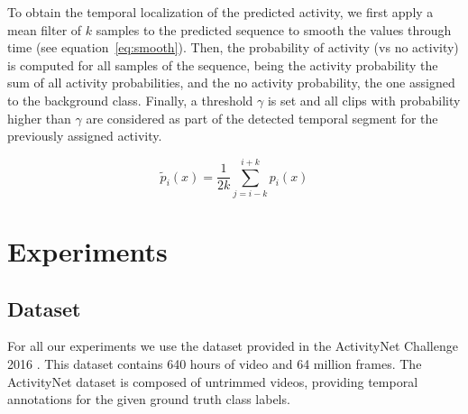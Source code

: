 \documentclass{article}
\begin{document}


To obtain the temporal localization of the predicted activity, we first apply a mean filter of $k$ samples to the predicted sequence to smooth the values through time (see equation~\ref{eq:smooth}). Then, the probability of activity (vs no activity) is computed for all samples of the sequence, being the activity probability the sum of all activity probabilities, and the no activity probability, the one assigned to the background class. Finally, a threshold $\gamma$ is set and all clips with probability higher than $\gamma$ are considered as part of the detected temporal segment for the previously assigned activity.

\begin{equation}
	\tilde{p}_i(x) = \frac{1}{2k} \sum_{j=i-k}^{i+k} p_i(x)
    \label{eq:smooth}
\end{equation}



\section{Experiments}

\subsection{Dataset}
For all our experiments we use the dataset provided in the ActivityNet Challenge 2016 \cite{}. This dataset contains 640 hours of video and 64 million frames. The ActivityNet dataset is composed of untrimmed videos, providing temporal annotations for the given ground truth class labels.
\end{document}
